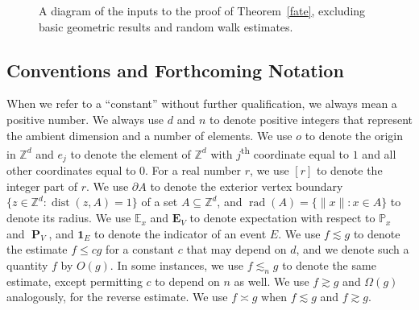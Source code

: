 \documentclass[11pt,reqno]{amsart}
\theoremstyle{definition}
\numberwithin{equation}{section}
\newcommand{\Z}{\mathbb{Z}}
\renewcommand{\P}{\mathbb{P}}
\newcommand{\E}{\mathbb{E}}
\newcommand{\1}{\mathbf{1}}
\DeclareMathOperator{\rad}{rad}
\newcommand{\bdy}{\partial}
\DeclareMathOperator{\dist}{dist}
\DeclareMathOperator{\PP}{\mathbf{P}}
\newcommand{\EE}{\mathbf{E}}
\begin{document}
\begin{figure}[htbp]
\centering {}
\caption[A diagram of the inputs to the proof of Theorem~\ref{fate}]{A diagram of the inputs to the proof of Theorem~\ref{fate}, excluding basic geometric results and random walk estimates.
}
\label{fig: logdep}
\end{figure}

\subsection*{Conventions and Forthcoming Notation} When we refer to a ``constant'' without further qualification, we always mean a positive number. We always use $d$ and $n$ to denote positive integers that represent the ambient dimension and a number of elements. We use $o$ to denote the origin in $\Z^d$ and $e_j$ to denote the element of $\Z^d$ with $j$\textsuperscript{th} coordinate equal to $1$ and all other coordinates equal to $0$. For a real number $r$, we use $[r]$ to denote the integer part of $r$. We use $\bdy A$ to denote the exterior vertex boundary $\{z \in \Z^d: \dist(z,A) = 1\}$ of a set $A \subseteq \Z^d$, and $\rad (A) = \{\|x\| : x \in A\}$ to denote its radius. We use $\E_x$ and $\EE_V$ to denote expectation with respect to $\P_x$ and $\PP_V$, and $\1_E$ to denote the indicator of an event $E$. We use $f \lesssim g$ to denote the estimate $f \leq c g$ for a constant $c$ that may depend on $d$, and we denote such a quantity $f$ by $O(g)$. In some instances, we use $f \lesssim_n g$ to denote the same estimate, except permitting $c$ to depend on $n$ as well. We use $f \gtrsim g$ and $\Omega (g)$ analogously, for the reverse estimate. We use $f \asymp g$ when $f \lesssim g$ and $f \gtrsim g$.
\end{document}
